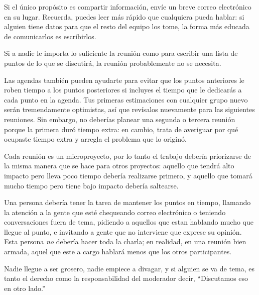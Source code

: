 \begin{descripción}

\item[Decidir si realmente se necesita una reunión.]
  Si el único propósito es compartir información,
  envíe un breve correo electrónico en su lugar.
  Recuerda,
  puedes leer más rápido que cualquiera pueda hablar:
  si alguien tiene datos para que el resto del equipo los tome,
  la forma más educada de comunicarlos es escribirlos.

\item[Escribir una agenda.]
  Si a nadie le importa lo suficiente la reunión como para escribir una lista de puntos
  de lo que se discutirá,
  la reunión probablemente no se necesita.

\item[Incluir horarios en la agenda.]
  Las agendas también pueden ayudarte para evitar que los puntos  anteriores le roben tiempo a los puntos posteriores
  si incluyes el tiempo que le dedicarás a cada punto en la agenda.
  Tus primeras estimaciones con cualquier grupo nuevo serán tremendamente optimistas,
  así que revísalos nuevamente para las siguientes reuniones.
  Sin embargo,
  no deberías planear una segunda o tercera reunión
  porque la primera duró tiempo extra:
  en cambio,
  trata de averiguar por qué ocupaste tiempo extra y arregla el problema que lo originó. 

\item[Priorizar.]
  Cada reunión es un microproyecto,
  por lo tanto el trabajo debería priorizarse de la misma manera que se hace para otros proyectos:
  aquello que tendrá alto impacto pero lleva poco tiempo debería realizarse primero,
  y aquello que tomará mucho tiempo pero tiene bajo impacto debería saltearse.

\item[Hacer a una persona responsable de mantener las cosas en movimiento.]
  Una persona debería tener la tarea de mantener los puntos en tiempo,
  llamando la atención a la gente que esté chequeando correo electrónico o  teniendo  conversaciones fuera de tema,
  pidiendo a aquellos que estan hablando mucho que llegue al punto,
  e invitando a gente que no interviene que exprese su opinión.
  Esta persona \emph{no} debería hacer toda la charla;
  en realidad, 
  en una reunión bien armada, aquel que este a cargo hablará menos 
  que los otros participantes.

\item[Pedir amabilidad.]
  Nadie llegue a ser grosero,
  nadie empiece a divagar,
  y si alguien se va de tema,
  es tanto el derecho como la responsabilidad del moderador decir,
  ``Discutamos eso en otro lado.''


\end{descripción}
